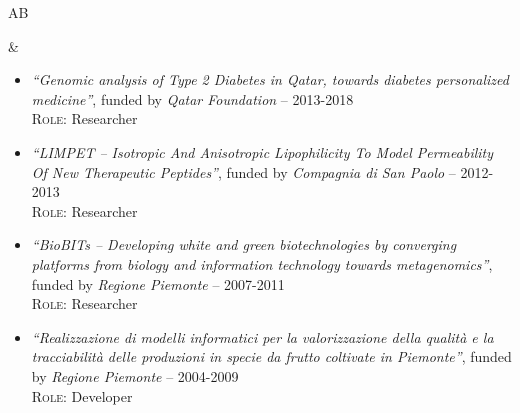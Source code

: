 \documentclass[a4paper,10pt]{article}
\newenvironment{doubletablelist}
{
	\vspace{-0.2cm}
	\begin{longtable}[!h]{AB}}{\end{longtable}
}
\newcommand{\dtlist}[2]{
\hspace{-3cm}
\noindent
	\begin{minipage}{0.24\textwidth}
	\begin{flushright}
	\textsc{#1}
	\end{flushright}
	\end{minipage}
	& #2\\[0.2cm]
}
\newcommand{\minusitem}{\item[-]}
\begin{document}
\begin{doubletablelist}
\dtlist{}{
	\vspace{-0.8cm}
	\begin{itemize} %
		\minusitem  \begin{minipage}{0.65\textwidth}
			\emph{``Genomic analysis of Type 2 Diabetes in Qatar, towards diabetes personalized medicine''}, funded by \emph{Qatar Foundation} -- 2013-2018\\
			\textsc{Role:} Researcher
		\end{minipage}
		\minusitem  \begin{minipage}{0.65\textwidth}
			\emph{``LIMPET -- Isotropic And Anisotropic Lipophilicity To Model Permeability Of New Therapeutic Peptides''}, funded by \emph{Compagnia di San Paolo} -- 2012-2013\\
			\textsc{Role:} Researcher
		\end{minipage}
		\minusitem   \begin{minipage}{0.65\textwidth}
			\emph{``BioBITs -- Developing white and green biotechnologies by converging platforms from biology and information technology towards metagenomics''}, funded by \emph{Regione Piemonte} -- 2007-2011\\
			\textsc{Role:} Researcher
		\end{minipage}	
		\minusitem  \begin{minipage}{0.65\textwidth}
			\emph{``Realizzazione di modelli informatici per la valorizzazione della qualit\`a e la tracciabilit\`a delle produzioni in specie da frutto coltivate in Piemonte''}, funded by \emph{Regione Piemonte} -- 2004-2009\\
			\textsc{Role:} Developer
		\end{minipage}		
	\end{itemize}
}




\end{doubletablelist}
\end{document}
